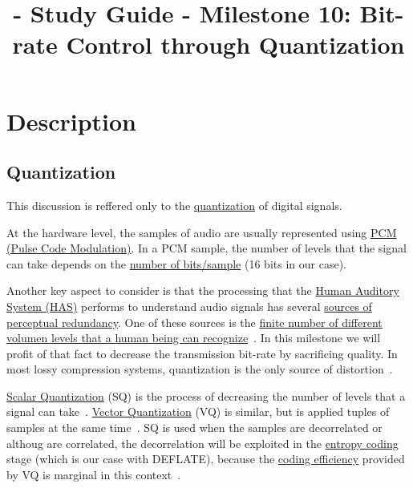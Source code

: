 
\title{\TM - Study Guide - Milestone 10: Bit-rate Control through Quantization}

\maketitle

\section{Description}

\subsection{Quantization}
This discussion is reffered only to the
\href{https://en.wikipedia.org/wiki/Quantization_(signal_processing)}{quantization}
of digital signals.

At the hardware level, the samples of audio are usually represented
using \href{https://en.wikipedia.org/wiki/Pulse-code_modulation}{PCM
  (Pulse Code Modulation)}. In a PCM sample, the number of levels that
the signal can take depends on the
\href{https://en.wikipedia.org/wiki/Audio_bit_depth}{number of
  bits/sample} (16 bits in our case).

Another key aspect to consider is that the processing that the
\href{https://en.wikipedia.org/wiki/Auditory_system}{Human Auditory
  System (HAS)} performs to understand audio signals has several
\href{https://en.wikipedia.org/wiki/Psychoacoustics}{sources of
  perceptual redundancy}. One of these sources is the
\href{https://en.wikipedia.org/wiki/Equal-loudness_contour}{finite
  number of different volumen levels that a human being can
  recognize}~\cite{bosi2003intro}. In this milestone we will profit of
that fact to decrease the transmission bit-rate by sacrificing
quality.  In most lossy compression systems, quantization is the only
source of distortion~\cite{taubman2002jpeg2000}.

\href{https://en.wikipedia.org/wiki/Quantization_(signal_processing)}{Scalar
  Quantization} (SQ) is the process of decreasing the number of levels
that a signal can
take~\cite{sayood2017introduction}. \href{https://en.wikipedia.org/wiki/Vector_quantization}{Vector
Quantization} (VQ) is similar, but is applied tuples of samples at the
same time~\cite{vetterli2014foundations}. SQ is used when the samples
are decorrelated or althoug are correlated, the decorrelation will be
exploited in
the \href{https://en.wikipedia.org/wiki/Entropy_encoding}{entropy
coding} stage (which is our case with DEFLATE), because the
\href{https://en.wikipedia.org/wiki/Quantization_(signal_processing)#Rate%E2%80%93distortion_optimization}{coding
  efficiency} provided by VQ is marginal in this
context~\cite{vetterli2014foundations}.

